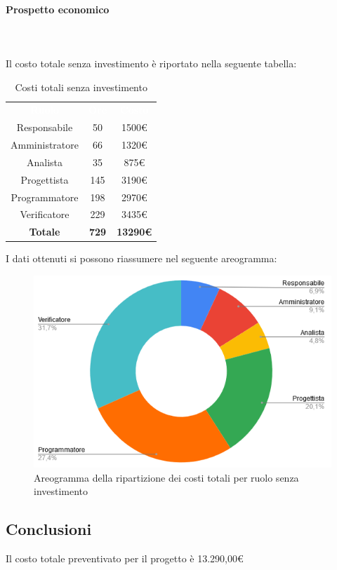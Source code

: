 \paragraph{Prospetto economico} \mbox{} \\ \mbox{} \\
Il costo totale senza investimento è riportato nella seguente tabella:

\begin{table}[H]
\centering\renewcommand{\arraystretch}{1.5}
\caption{Costi totali senza investimento}
\vspace{0.2cm}
\begin{tabular}{ c c c }
\rowcolor{redafk}
\textcolor{white}{\textbf{Ruolo}} & \textcolor{white}{\textbf{Ore}} & 
\textcolor{white}{\textbf{Costo}}  \\
Responsabile & 50 & 1500€ \\
Amministratore & 66 & 1320€ \\
Analista & 35 & 875€ \\
Progettista	& 145 & 3190€ \\
Programmatore & 198 & 2970€  \\
Verificatore & 229 & 3435€  \\
\rowcolor{lastrowcolor}
\textbf{Totale} & \textbf{729} & \textbf{13290€}  \\
\end{tabular}
\end{table}

I dati ottenuti si possono riassumere nel seguente areogramma:
\begin{figure}[H]
\centering
\includegraphics[scale=0.60]{img/grafici/torta_tot_no_analisi.png}
\caption{Areogramma della ripartizione dei costi totali per ruolo senza investimento}
\end{figure}

\subsection{Conclusioni}
Il costo totale preventivato per il progetto è 13.290,00€